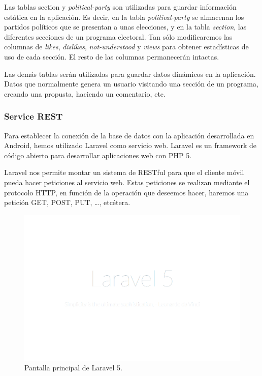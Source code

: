 Las tablas section y \textit{political-party} son utilizadas para guardar información estática en la aplicación. Es decir, en la tabla \textit{political-party} se almacenan los partidos políticos que se presentan a unas elecciones, y en la tabla \textit{section}, las diferentes secciones de un programa electoral. Tan sólo modificaremos las columnas de \textit{likes}, \textit{dislikes}, \textit{not-understood} y \textit{views} para obtener estadísticas de uso de cada sección. El resto de las columnas permanecerán intactas.

Las demás tablas serán utilizadas para guardar datos dinámicos en la aplicación. Datos que normalmente genera un usuario visitando una sección de un programa, creando una propusta, haciendo un comentario, etc.

    
		\subsubsection{Service REST}\label{sssec:rest}
		
Para establecer la conexión de la base de datos con la aplicación desarrollada en Android, hemos utilizado Laravel como servicio web. Laravel es un framework de código abierto para desarrollar aplicaciones web con PHP 5.

Laravel nos permite montar un sistema de RESTful para que el cliente móvil pueda hacer peticiones al servicio web. Estas peticiones se realizan mediante el protocolo HTTP, en función de la operación que deseemos hacer, haremos una petición GET, POST, PUT, …, etcétera.

	\begin{figure}[H]
      \centering
	\includegraphics[keepaspectratio, scale=0.30]{Media/Captures/laravel5.png}
      \caption{Pantalla principal de Laravel 5.}
      \label{fig:laravel5}
    \end{figure}

